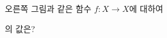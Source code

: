 \noindent\begin{minipage}[t]{0.58\linewidth}\vspace{0pt}\raggedright 오른쪽 그림과 같은 함수 $f:X\longrightarrow X$에 대하여\par\smallskip\end{minipage}\hfill\begin{minipage}[t]{0.4\linewidth}\vspace{0pt}\centering \resizebox{\ifdim\width>\linewidth\linewidth\else\width\fi}{!}{}\end{minipage}\par
\noindent {}\par{}\par\smallskip\noindent 의 값은?

